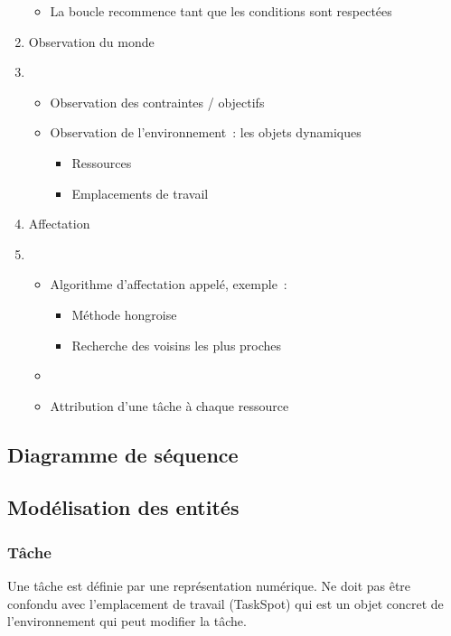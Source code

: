 \begin{enumerate}
\begin{itemize}
	\item La boucle recommence tant que les conditions sont respectées
	\end{itemize}
%
\item Observation du monde
\item[]
	\begin{itemize}
	\setlength{\itemsep}{5pt}
	\item Observation des contraintes / objectifs
	\item Observation de l'environnement~: les objets dynamiques
		\begin{itemize}
		\setlength{\itemsep}{2pt}
		\item Ressources
		\item Emplacements de travail
		\end{itemize}
	\end{itemize}
%
\item Affectation
\item[]
	\begin{itemize}
	\setlength{\itemsep}{5pt}
	\item Algorithme d'affectation appelé, exemple~:
		\begin{itemize}
		\setlength{\itemsep}{2pt}
		\item Méthode hongroise
		\item Recherche des voisins les plus proches
		\end{itemize}
		\item %
	\item Attribution d'une tâche à chaque ressource
	\end{itemize}
\end{enumerate} %

%
\subsection{Diagramme de séquence}

%
\subsection{Modélisation des entités}

\subsubsection*{Tâche}

Une tâche est définie par une représentation numérique. Ne doit pas être confondu avec l'emplacement de travail (TaskSpot) qui est un objet concret de l'environnement qui peut modifier la  tâche.

